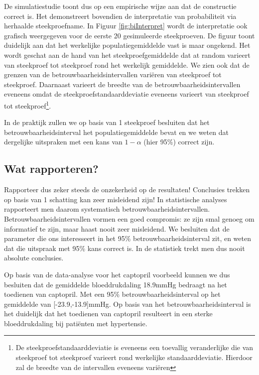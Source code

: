\documentclass[
  12pt,dutch,coursenotes]{book}
\theoremstyle{definition}
\theoremstyle{definition}
\theoremstyle{definition}
\theoremstyle{remark}
\begin{document}
De simulatiestudie toont dus op een empirische wijze aan dat de constructie correct is.
Het demonstreert bovendien de interpretatie van probabiliteit via herhaalde steekproefname.
In Figuur \ref{fig:biInterpret} wordt de interpretatie ook grafisch weergegeven voor de eerste 20 gesimuleerde steekproeven. De figuur toont duidelijk aan dat het werkelijke populatiegemiddelde vast is maar ongekend. Het wordt geschat aan de hand van het steekproefgemiddelde dat at random varieert van steekproef tot steekproef rond het werkelijk gemiddelde.
We zien ook dat de grenzen van de betrouwbaarheidsintervallen variëren van steekproef tot steekproef.
Daarnaast varieert de breedte van de betrouwbaarheidsintervallen eveneens omdat de steekproefstandaarddeviatie eveneens varieert van steekproef tot steekproef\footnote{De steekproefstandaarddeviatie is eveneens een toevallig veranderlijke die van steekproef tot steekproef varieert rond werkelijke standaarddeviatie. Hierdoor zal de breedte van de intervallen eveneens variëren}.

In de praktijk zullen we op basis van 1 steekproef besluiten dat het betrouwbaarheidsinterval het populatiegemiddelde bevat en we weten dat dergelijke uitspraken met een kans van \(1-\alpha\) (hier 95\%) correct zijn.

\hypertarget{wat-rapporteren}{%
\subsection{Wat rapporteren?}\label{wat-rapporteren}}

Rapporteer dus zeker steeds de onzekerheid op de resultaten! Conclusies trekken op basis van 1 schatting kan zeer misleidend zijn! In statistische analyses rapporteert men daarom systematisch betrouwbaarheidsintervallen.
Betrouwbaarheidsintervallen vormen een goed compromis: ze zijn smal genoeg om informatief te zijn, maar haast nooit zeer misleidend. We besluiten dat de parameter die ons interesseert in het 95\% betrouwbaarheidsinterval zit,
en weten dat die uitspraak met 95\% kans correct is.
In de statistiek trekt men dus nooit absolute conclusies.

Op basis van de data-analyse voor het captopril voorbeeld kunnen we dus besluiten dat de gemiddelde bloeddrukdaling
18.9mmHg bedraagt na het toedienen van captopril. Met een 95\% betrouwbaarheidsinterval op het gemiddelde van {[}-23.9,-13.9{]}mmHg.
Op basis van het betrouwbaarheidsinterval is het duidelijk dat het toedienen van captopril resulteert in een sterke bloeddrukdaling bij patiënten met hypertensie.
\end{document}
